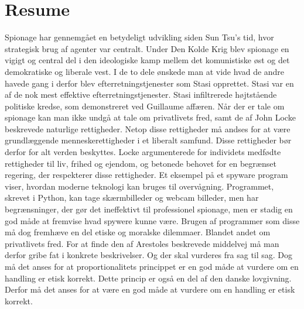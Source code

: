 \section*{Resume}
Spionage har gennemgået en betydeligt udvikling siden Sun Tsu's tid, hvor strategisk brug af agenter var centralt. Under Den Kolde Krig  blev spionage en vigigt og central del i den ideologiske kamp mellem det komunistiske øst og det demokratiske og liberale vest. I de to dele ønskede man at vide hvad de andre havede gang i derfor blev efterretningstjenester som Stasi opprettet. Stasi var en af de nok mest effektive efterretningstjenester. Stasi infiltrerede højtstående politiske kredse, som demonstreret ved Guillaume affæren. Når der er tale om spionage kan man ikke undgå at tale om privatlivets fred, samt de af John Locke beskrevede naturlige rettigheder. Netop disse rettigheder må andses for at være grundlæggende menneskerettigheder i et liberalt samfund. Disse rettigheder bør derfor for alt verden beskyttes. Locke argumenterede for individets medfødte rettigheder til liv, frihed og ejendom, og betonede behovet for en begrænset regering, der respekterer disse rettigheder. Et eksempel på et spyware program viser, hvordan moderne teknologi kan bruges til overvågning. Programmet, skrevet i Python, kan tage skærmbilleder og webcam billeder, men har begrænsninger, der gør det ineffektivt til professionel spionage, men er stadig en god måde at fremvise hvad spywere kunne være. Brugen af programmer som disse må dog fremhæve en del etiske og moralske dilemmaer. Blandet andet om privatlivets fred. For at finde den af Arestoles beskrevede middelvej må man derfor gribe fat i konkrete beskrivelser. Og der skal vurderes fra sag til sag. Dog må det anses for at proportionalitets princippet er en god måde at vurdere om en handling er etisk korrekt. Dette princip er også en del af den danske lovgivning. Derfor må det anses for at være en god måde at vurdere om en handling er etisk korrekt.

\newpage